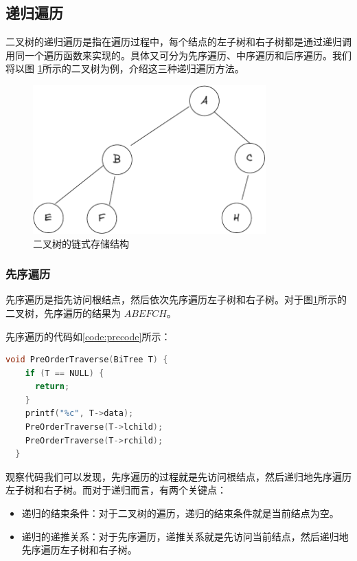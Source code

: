 \documentclass[lang=cn,newtx,10pt,scheme=chinese]{elegantbook}
\begin{document}
\subsection{递归遍历}

二叉树的递归遍历是指在遍历过程中，每个结点的左子树和右子树都是通过递归调用同一个遍历函数来实现的。具体又可分为先序遍历、中序遍历和后序遍历。我们将以图
\ref{fig:binary_tree_link}所示的二叉树为例，介绍这三种递归遍历方法。

\begin{figure}
  \centering
  \includegraphics[width=0.8\textwidth]{./figure/pdf/cropped/oneBTree.pdf}
  \caption{二叉树的链式存储结构}
  \label{fig:binary_tree_link}
\end{figure}

\subsubsection{先序遍历}

先序遍历是指先访问根结点，然后依次先序遍历左子树和右子树。对于图\ref{fig:binary_tree_link}所示的二叉树，先序遍历的结果为 $ABEFCH$。

先序遍历的代码如\ref{code:precode}所示：

\begin{lstlisting}[language=C++, caption={先序遍历}, label={code:precode}]
  void PreOrderTraverse(BiTree T) {
    if (T == NULL) {
      return;
    }
    printf("%c", T->data);
    PreOrderTraverse(T->lchild);
    PreOrderTraverse(T->rchild);
  }
\end{lstlisting}

观察代码我们可以发现，先序遍历的过程就是先访问根结点，然后递归地先序遍历左子树和右子树。而对于递归而言，有两个关键点：

\begin{itemize}
  \item 递归的结束条件：对于二叉树的遍历，递归的结束条件就是当前结点为空。
  \item 递归的递推关系：对于先序遍历，递推关系就是先访问当前结点，然后递归地先序遍历左子树和右子树。
  \end{itemize}
\end{document}
